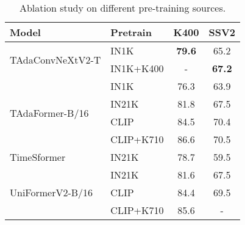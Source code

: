 \documentclass[10pt,journal,compsoc]{IEEEtran}
\newcommand{\tablestyle}[2]{\setlength{\tabcolsep}{#1}\renewcommand{\arraystretch}{#2}\centering\small}
\newcommand\graycell[0]{\cellcolor{midgrey}}
\begin{document}
\begin{table}[t]
\caption{Ablation study on different pre-training sources.}
\centering
\vspace{-3mm}
\tablestyle{6pt}{1.0}
\begin{tabular}{llcc}
\toprule
\footnotesize Model & \footnotesize Pretrain & \footnotesize K400 & \footnotesize SSV2 \\
\midrule
\multirow{2}{*}{TAdaConvNeXtV2-T} & IN1K & \graycell\bf79.6 & 65.2 \\
~ & IN1K+K400 & - & \graycell\bf67.2\\
\midrule
\multirow{4}{*}{TAdaFormer-B/16} & IN1K & 76.3 & 63.9 \\
~ & IN21K & 81.8 & 67.5 \\
~ & CLIP & \graycell 84.5 & \graycell 70.4 \\
~ & CLIP+K710 & 86.6 & 70.5 \\
\midrule
TimeSformer~\cite{timesformer} & IN21K & 78.7 & 59.5 \\
\midrule
\multirow{3}{*}{UniFormerV2-B/16~\cite{li2022uniformerv2}} & IN21K & 81.6 & 67.5 \\
~ & CLIP & 84.4 & 69.5 \\ 
~ & CLIP+K710 & 85.6 & - \\
\bottomrule
\end{tabular}
\label{tab:ablation-pretrain}
\vspace{-3mm}
\end{table}
\end{document}
